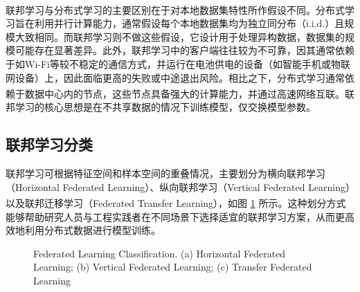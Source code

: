 联邦学习与分布式学习的主要区别在于对本地数据集特性所作假设不同\textsuperscript{\cite{konevcny2015federated}}。分布式学习旨在利用并行计算能力，通常假设每个本地数据集均为独立同分布（i.i.d.）且规模大致相同。而联邦学习则不做这些假设，它设计用于处理异构数据，数据集的规模可能存在显著差异。此外，联邦学习中的客户端往往较为不可靠，因其通常依赖于如Wi-Fi等较不稳定的通信方式，并运行在电池供电的设备（如智能手机或物联网设备）上，因此面临更高的失败或中途退出风险。相比之下，分布式学习通常依赖于数据中心内的节点，这些节点具备强大的计算能力，并通过高速网络互联\textsuperscript{\cite{kairouz2021advances}}。联邦学习的核心思想是在不共享数据的情况下训练模型，仅交换模型参数。

\subsection{联邦学习分类}
联邦学习可根据特征空间和样本空间的重叠情况，主要划分为横向联邦学习（Horizontal Federated Learning）、纵向联邦学习（Vertical Federated Learning）以及联邦迁移学习（Federated Transfer Learning）\textsuperscript{\cite{yang2019federated,li2020federated}}，如图 \ref{FedClass} 所示。这种划分方式能够帮助研究人员与工程实践者在不同场景下选择适宜的联邦学习方案，从而更高效地利用分布式数据进行模型训练。
\vspace{-0.1cm}
\begin{figure}[!h]
	\centering
	\hspace{0.01\textwidth}
	\hspace{0.01\textwidth}
	{\centering \wuhao Federated Learning Classification. (a) Horizontal Federated Learning; (b) Vertical Federated Learning; (c) Transfer Federated Learning}	
	\label{FedClass}
\end{figure}
